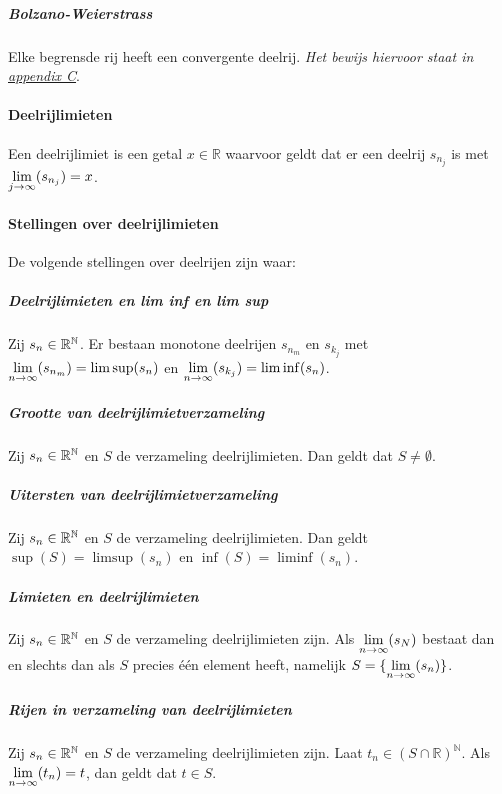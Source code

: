 \subparagraph{Bolzano-Weierstrass} Elke begrensde rij heeft een convergente deelrij. \textit{Het bewijs hiervoor staat in \hyperref[sec:AC]{appendix C}}.

\paragraph{Deelrijlimieten} Een deelrijlimiet is een getal $x\in\mathbb{R}$ waarvoor geldt dat er een deelrij $s_{n_{j}}$ is met $\underset{j\to\infty}{\text{lim}}(s_{n_{j}})=x$.

\paragraph{Stellingen over deelrijlimieten} De volgende stellingen over deelrijen zijn waar:

\subparagraph{Deelrijlimieten en lim inf en lim sup} Zij $s_{n}\in\mathbb{R}^{\mathbb{N}}$. Er bestaan monotone deelrijen $s_{n_{m}}$ en $s_{k_{j}}$ met $\underset{n\to\infty}{\text{lim}}(s_{n_{m}})=\limsup(s_{n})$ en $\underset{n\to\infty}{\text{lim}}(s_{k_{j}})=\liminf(s_{n})$.

\subparagraph{Grootte van deelrijlimietverzameling} Zij $s_{n}\in\mathbb{R}^{\mathbb{N}}$ en $S$ de verzameling deelrijlimieten. Dan geldt dat $S\neq\emptyset$.

\subparagraph{Uitersten van deelrijlimietverzameling} Zij $s_{n}\in\mathbb{R}^{\mathbb{N}}$ en $S$ de verzameling deelrijlimieten. Dan geldt $\sup(S)=\limsup(s_{n})$ en $\inf(S)=\liminf(s_{n})$.

\subparagraph{Limieten en deelrijlimieten} Zij $s_{n}\in\mathbb{R}^{\mathbb{N}}$ en $S$ de verzameling deelrijlimieten zijn. Als $\underset{n\to\infty}{\text{lim}}(s_{N})$ bestaat dan en slechts dan als $S$ precies één element heeft, namelijk $S=\{\underset{n\to\infty}{\text{lim}}(s_{n})\}$.

\subparagraph{Rijen in verzameling van deelrijlimieten} Zij $s_{n}\in\mathbb{R}^{\mathbb{N}}$ en $S$ de verzameling deelrijlimieten zijn. Laat $t_{n}\in(S\cap\mathbb{R})^{\mathbb{N}}$. Als $\underset{n\to\infty}{\text{lim}}(t_{n})=t$, dan geldt dat $t \in S$.
